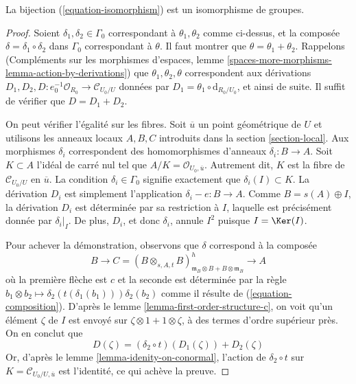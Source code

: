 \begin{lemma}
\label{lemma-composition-is-addition}
La bijection (\ref{equation-isomorphism}) est un isomorphisme
de groupes.
\end{lemma}

\begin{proof}
Soient $\delta_1, \delta_2 \in \Gamma_0$ correspondant à $\theta_1, \theta_2$
comme ci-dessus, et la composée $\delta = \delta_1 \circ \delta_2$
dans $\Gamma_0$ correspondant à $\theta$. Il faut montrer que
$\theta = \theta_1 + \theta_2$. Rappelons
(Compléments sur les morphismes d'espaces, lemme
\ref{spaces-more-morphisms-lemma-action-by-derivations})
que $\theta_1, \theta_2, \theta$ correspondent aux dérivations
$D_1, D_2, D : e_0^{-1}\mathcal{O}_{R_0} \to \mathcal{C}_{U_0/U}$
données par $D_1 = \theta_1 \circ \text{d}_{R_0/U_0}$, et ainsi de suite.
Il suffit de vérifier que $D = D_1 + D_2$.

\medskip\noindent
On peut vérifier l'égalité sur les fibres.
Soit $\overline{u}$ un point géométrique de $U$ et utilisons les anneaux
locaux $A, B, C$ introduits dans la section \ref{section-local}.
Aux morphismes $\delta_i$ correspondent des homomorphismes d'anneaux
$\delta_i : B \to A$. Soit $K \subset A$ l'idéal de carré nul tel que
$A/K = \mathcal{O}_{U_0, \overline{u}}$.
Autrement dit, $K$ est la fibre de $\mathcal{C}_{U_0/U}$ en $\overline{u}$.
La condition $\delta_i \in \Gamma_0$
signifie exactement que $\delta_i(I) \subset K$.
La dérivation $D_i$ est simplement l'application $\delta_i - e : B \to A$.
Comme $B = s(A) \oplus I$, la dérivation $D_i$ est déterminée par
sa restriction à $I$, laquelle est précisément donnée par
$\delta_i|_I$. De plus, $D_i$, et donc $\delta_i$, annule $I^2$
puisque $I = \Ker(I)$.

\medskip\noindent
Pour achever la démonstration, observons que $\delta$ correspond à la
composée
$$
B \to C =
(B \otimes_{s, A, t} B)^h_{\mathfrak m_B \otimes B + B \otimes \mathfrak m_B}
\to A
$$
où la première flèche est $c$ et la seconde est déterminée
par la règle
$b_1 \otimes b_2 \mapsto \delta_2(t(\delta_1(b_1))) \delta_2(b_2)$
comme il résulte de (\ref{equation-composition}).
D'après le lemme \ref{lemma-first-order-structure-c},
on voit qu'un élément $\zeta$ de $I$ est envoyé sur
$\zeta \otimes 1 + 1 \otimes \zeta$, à des termes d'ordre supérieur près.
On en conclut que
$$
D(\zeta) = (\delta_2 \circ t)\left(D_1(\zeta)\right) + D_2(\zeta)
$$
Or, d'après le lemme \ref{lemma-idenity-on-conormal},
l'action de $\delta_2 \circ t$ sur
$K = \mathcal{C}_{U_0/U, \overline{u}}$ est l'identité, ce qui
achève la preuve.
\end{proof}






